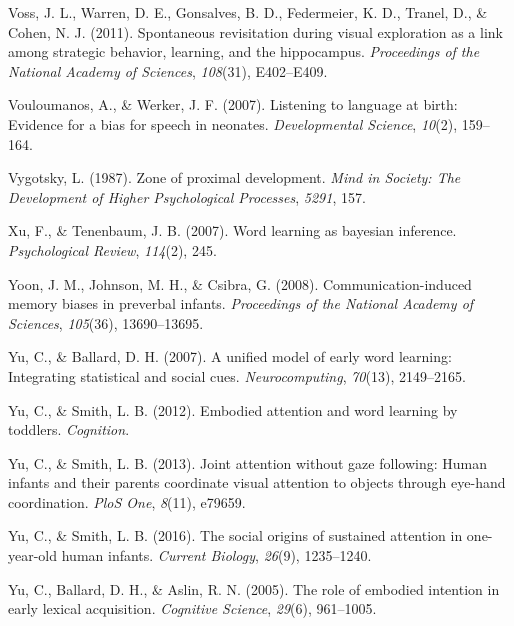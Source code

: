 \documentclass[a4paper,man,apacite,floatsintext]{apa6}
\begin{document}
\hypertarget{ref-voss2011spontaneous}{}
Voss, J. L., Warren, D. E., Gonsalves, B. D., Federmeier, K. D., Tranel,
D., \& Cohen, N. J. (2011). Spontaneous revisitation during visual
exploration as a link among strategic behavior, learning, and the
hippocampus. \emph{Proceedings of the National Academy of Sciences},
\emph{108}(31), E402--E409.

\hypertarget{ref-vouloumanos2007listening}{}
Vouloumanos, A., \& Werker, J. F. (2007). Listening to language at
birth: Evidence for a bias for speech in neonates. \emph{Developmental
Science}, \emph{10}(2), 159--164.

\hypertarget{ref-vygotsky1987zone}{}
Vygotsky, L. (1987). Zone of proximal development. \emph{Mind in
Society: The Development of Higher Psychological Processes},
\emph{5291}, 157.

\hypertarget{ref-xu2007word}{}
Xu, F., \& Tenenbaum, J. B. (2007). Word learning as bayesian inference.
\emph{Psychological Review}, \emph{114}(2), 245.

\hypertarget{ref-yoon2008communication}{}
Yoon, J. M., Johnson, M. H., \& Csibra, G. (2008). Communication-induced
memory biases in preverbal infants. \emph{Proceedings of the National
Academy of Sciences}, \emph{105}(36), 13690--13695.

\hypertarget{ref-yu2007unified}{}
Yu, C., \& Ballard, D. H. (2007). A unified model of early word
learning: Integrating statistical and social cues.
\emph{Neurocomputing}, \emph{70}(13), 2149--2165.

\hypertarget{ref-yu2012embodied}{}
Yu, C., \& Smith, L. B. (2012). Embodied attention and word learning by
toddlers. \emph{Cognition}.

\hypertarget{ref-yu2013joint}{}
Yu, C., \& Smith, L. B. (2013). Joint attention without gaze following:
Human infants and their parents coordinate visual attention to objects
through eye-hand coordination. \emph{PloS One}, \emph{8}(11), e79659.

\hypertarget{ref-yu2016social}{}
Yu, C., \& Smith, L. B. (2016). The social origins of sustained
attention in one-year-old human infants. \emph{Current Biology},
\emph{26}(9), 1235--1240.

\hypertarget{ref-yu2005role}{}
Yu, C., Ballard, D. H., \& Aslin, R. N. (2005). The role of embodied
intention in early lexical acquisition. \emph{Cognitive Science},
\emph{29}(6), 961--1005.


\end{document}
